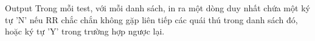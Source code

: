 Output
Trong mỗi test, với mỗi danh sách, in ra một dòng duy nhất chứa một ký tự 'N' nếu RR chắc chắn không gặp liên tiếp các quái thú trong danh sách đó, hoặc ký tự 'Y' trong trường hợp ngược lại.
